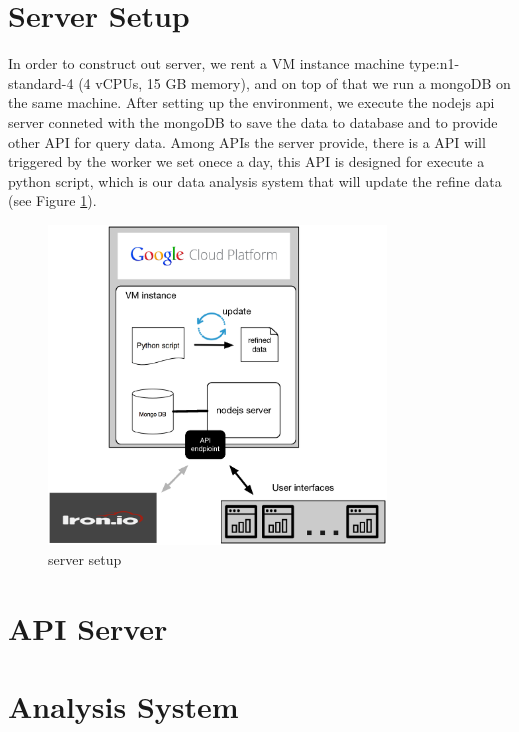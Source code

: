 \section{Server Setup}
In order to construct out server, we rent a VM instance machine type:n1-standard-4 (4 vCPUs, 15 GB memory), and on top of that we run a mongoDB on the same machine.
After setting up the environment, we execute the nodejs api server conneted with the mongoDB to save the data to database and to provide other API for query data.
Among APIs the server provide, there is a API will triggered by the worker we set onece a day, this API is designed for execute a python script, which is our data analysis system that will update the refine data (see Figure \ref{fig:serversetup}).
\begin{figure}[H]
    \centering
    \includegraphics[width = 0.8\textwidth]{fig/serversetup.eps}
    \caption{server setup}
    \label{fig:serversetup}
\end{figure}

\section{API Server}
\section{Analysis System}
